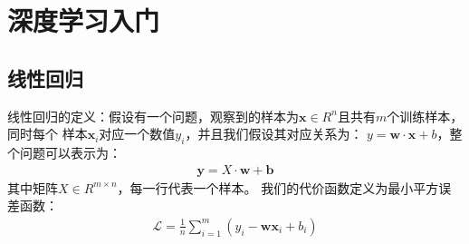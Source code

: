 \documentclass{article}
\begin{document}
\section{深度学习入门}
\subsection{线性回归}
线性回归的定义：假设有一个问题，观察到的样本为$\boldsymbol{x} \in R^{n}$且共有$m$个训练样本，同时每个
样本$\boldsymbol{x}_{i}$对应一个数值$y_{i}$，并且我们假设其对应关系为：
$y=\boldsymbol{w} \cdot \boldsymbol{x}+b$，整个问题可以表示为：
\begin{equation}
    \begin{aligned}
        \boldsymbol{y} = X \cdot \boldsymbol{w} + \boldsymbol{b}
    \end{aligned}
    \label{e000001}
\end{equation}
其中矩阵$X \in R^{m \times n}$，每一行代表一个样本。\newline
我们的代价函数定义为最小平方误差函数：
\begin{equation}
    \begin{aligned}
        \mathcal{L}=\frac{1}{n}\sum_{i=1}^{m}(y_{i} - \boldsymbol{w} \boldsymbol{x}_{i} + b_{i})
    \end{aligned}
    \label{e000002}
\end{equation}
\end{document}
